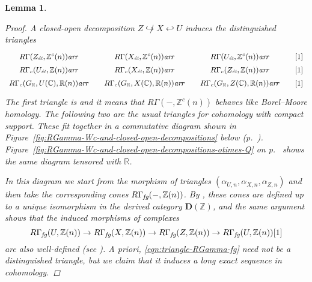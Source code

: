 \documentclass[10pt,a4paper,oneside]{article}
\newcommand{\CC}{\mathbb{C}}
\newcommand{\RR}{\mathbb{R}}
\newcommand{\ZZ}{\mathbb{Z}}
\newcommand{\ar}{\text{\it ar}}
\newcommand{\et}{\text{\it \'{e}t}}
\newcommand{\fg}{\text{\it fg}}
\theoremstyle{myplain}
\newtheorem{lemma}[theorem]{Lemma}
\theoremstyle{mydefinition}
\numberwithin{equation}{section}
\begin{document}
\begin{lemma}
  \begin{proof}
    A closed-open decomposition $Z \not\hookrightarrow X \hookleftarrow U$
    induces the distinguished triangles
    \[ \begin{tikzcd}[row sep=0pt,column sep=1em,font=\small]
        R\Gamma (Z_\et, \ZZ^c (n)) \ar{r} & R\Gamma (X_\et, \ZZ^c (n)) \ar{r} & R\Gamma (U_\et, \ZZ^c (n)) \ar{r} & {[1]} \\
        R\Gamma_c (U_\et, \ZZ (n)) \ar{r} & R\Gamma_c (X_\et, \ZZ (n)) \ar{r} & R\Gamma_c (Z_\et, \ZZ (n)) \ar{r} & {[1]} \\
        R\Gamma_c (G_\RR, U (\CC), \RR (n)) \ar{r} & R\Gamma_c (G_\RR, X (\CC), \RR (n)) \ar{r} & R\Gamma_c (G_\RR, Z (\CC), \RR (n)) \ar{r} & {[1]}
      \end{tikzcd} \]
    The first triangle is \cite[Corollary~7.2]{Geisser-2010} and it means that
    $R\Gamma (-, \ZZ^c (n))$ behaves like Borel--Moore homology. The following
    two are the usual triangles for cohomology with compact support. These fit
    together in a commutative diagram shown in
    Figure~\ref{fig:RGamma-Wc-and-closed-open-decompositions} below
    (p.~\pageref{fig:RGamma-Wc-and-closed-open-decompositions}). Figure~\ref{fig:RGamma-Wc-and-closed-open-decompositions-otimes-Q}
    on p.~\pageref{fig:RGamma-Wc-and-closed-open-decompositions-otimes-Q} shows
    the same diagram tensored with $\RR$.

    In this diagram we start from the morphism of triangles
    $(\alpha_{U,n}, \alpha_{X,n}, \alpha_{Z,n})$ and then take the corresponding
    cones $R\Gamma_\fg (-, \ZZ(n))$. By
    \cite[Proposition~5.6]{Beshenov-Weil-etale-1}, these cones are defined up to
    a \emph{unique} isomorphism in the derived category $\mathbf{D} (\ZZ)$, and
    the same argument shows that the induced morphisms of complexes
    \begin{equation}
      \label{eqn:triangle-RGamma-fg}
      R\Gamma_\fg (U, \ZZ(n)) \to
      R\Gamma_\fg (X, \ZZ(n)) \to
      R\Gamma_\fg (Z, \ZZ(n)) \to
      R\Gamma_\fg (U, \ZZ(n)) [1]
    \end{equation}
    are also well-defined
    (see \cite[Corollary~A.3]{Beshenov-Weil-etale-1}). A priori,
    \eqref{eqn:triangle-RGamma-fg} need not be a distinguished triangle, but we
    claim that it induces a long exact sequence in cohomology.


\end{proof}
\end{lemma}
\end{document}
